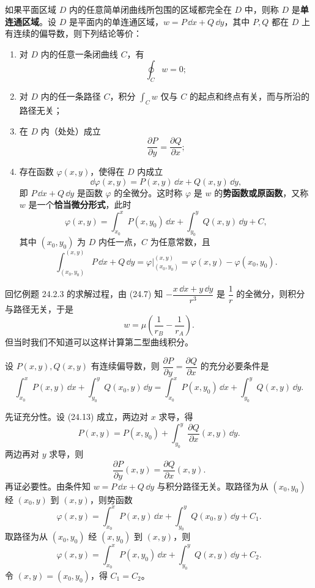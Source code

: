 如果平面区域 $D$ 内的任意简单闭曲线所包围的区域都完全在 $D$ 中，则称 $D$ 是\textbf{单连通区域}。设 $D$ 是平面内的单连通区域，$w=P\,\dd x+Q\,\dd y$，其中 $P,Q$ 都在 $D$ 上有连续的偏导数，则下列结论等价：
\begin{enumerate}[label=\arabic*.]
  \item 对 $D$ 内的任意一条闭曲线 $C$，有
  \[
    \oint_Cw=0;
  \]
  \item 对 $D$ 内的任一条路径 $C$，积分 $\int_Cw$ 仅与 $C$ 的起点和终点有关，而与所沿的路径无关；
  \item 在 $D$ 内（处处）成立
  \[
    \frac{\partial P}{\partial y}=\frac{\partial Q}{\partial x};
  \]
  \item 存在函数 $\varphi(x,y)$，使得在 $D$ 内成立
  \[
    \dd\varphi(x,y)=P(x,y)\,\dd x+Q(x,y)\,\dd y,
  \]
  即 $P\,\dd x+Q\,\dd y$ 是函数 $\varphi$ 的全微分。这时称 $\varphi$ 是 $w$ 的\textbf{势函数或原函数}，又称 $w$ 是一个\textbf{恰当微分形式}，此时
  \begin{equation}
    \varphi(x,y)=\int_{x_0}^xP(x,y_0)\,\dd x+\int_{y_0}^yQ(x,y)\,\dd y+C,
    \tag{24.12}
    \label{eq:24.12}
  \end{equation}
  其中 $(x_0,y_0)$ 为 $D$ 内任一点，$C$ 为任意常数，且
  \[
    \int_{(x_0,y_0)}^{(x,y)}P\,\dd x+Q\,\dd y
    =\left.\varphi\right|_{(x_0,y_0)}^{(x,y)}
    =\varphi(x,y)-\varphi(x_0,y_0).
  \]
\end{enumerate}

\begin{xremark}
回忆例题 24.2.3 的求解过程，由 (24.7) 知 $-\dfrac{x\,\dd x+y\,\dd y}{r^3}$ 是 $\dfrac1r$ 的全微分，则积分与路径无关，于是
\[
  w=\mu\left(\frac1{r_B}-\frac1{r_A}\right).
\]
但当时我们不知道可以这样计算第二型曲线积分。
\end{xremark}

\begin{xexample}[24.3.5]
设 $P(x,y),Q(x,y)$ 有连续偏导数，则 $\dfrac{\partial P}{\partial y}=\dfrac{\partial Q}{\partial x}$ 的充分必要条件是
\begin{equation}
  \int_{x_0}^xP(x,y)\,\dd x+\int_{y_0}^yQ(x_0,y)\,\dd y
  =\int_{x_0}^xP(x,y_0)\,\dd x+\int_{y_0}^yQ(x,y)\,\dd y.
  \tag{24.13}
  \label{eq:24.13}
\end{equation}
\end{xexample}
\begin{xproof}
先证充分性。设 (24.13) 成立，两边对 $x$ 求导，得
\[
  P(x,y)=P(x,y_0)+\int_{y_0}^y\frac{\partial Q}{\partial x}(x,y)\,\dd y.
\]
两边再对 $y$ 求导，则
\[
  \frac{\partial P}{\partial y}(x,y)=\frac{\partial Q}{\partial x}(x,y).
\]
再证必要性。由条件知 $w=P\,\dd x+Q\,\dd y$ 与积分路径无关。取路径为从 $(x_0,y_0)$ 经 $(x_0,y)$ 到 $(x,y)$，则势函数
\[
  \varphi(x,y)=\int_{x_0}^xP(x,y)\,\dd x+\int_{y_0}^yQ(x_0,y)\,\dd y+C_1.
\]
取路径为从 $(x_0,y_0)$ 经 $(x,y_0)$ 到 $(x,y)$，则
\[
  \varphi(x,y)=\int_{x_0}^xP(x,y_0)\,\dd x+\int_{y_0}^yQ(x,y)\,\dd y+C_2.
\]
令 $(x,y)=(x_0,y_0)$，得 $C_1=C_2$。
\end{xproof}

